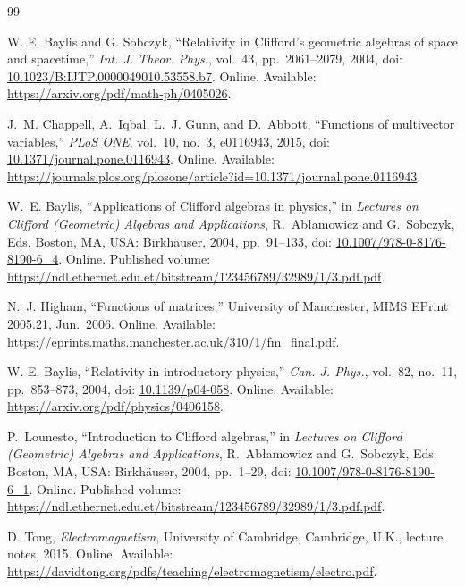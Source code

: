 \documentclass[11pt]{article}
\numberwithin{equation}{section}
\begin{document}
\clearpage
\begin{thebibliography}{99}
W. E. Baylis and G. Sobczyk,
``Relativity in Clifford's geometric algebras of space and spacetime,''
\emph{Int. J. Theor. Phys.}, vol.~43, pp.~2061--2079, 2004,
doi: \href{https://doi.org/10.1023/B:IJTP.0000049010.53558.b7}{10.1023/B:IJTP.0000049010.53558.b7}.
Online. Available: \url{https://arxiv.org/pdf/math-ph/0405026}.

J.~M. Chappell, A.~Iqbal, L.~J. Gunn, and D.~Abbott,
``Functions of multivector variables,'' \emph{PLoS ONE}, vol.~10, no.~3,
e0116943, 2015,
doi: \href{https://doi.org/10.1371/journal.pone.0116943}{10.1371/journal.pone.0116943}.
Online. Available: \url{https://journals.plos.org/plosone/article?id=10.1371/journal.pone.0116943}.

W.~E. Baylis, ``Applications of Clifford algebras in physics,''
in \emph{Lectures on Clifford (Geometric) Algebras and Applications},
R.~Ab{\l}amowicz and G.~Sobczyk, Eds. Boston, MA, USA: Birkh{\"a}user,
2004, pp.~91--133,
doi: \href{https://doi.org/10.1007/978-0-8176-8190-6_4}{10.1007/978-0-8176-8190-6\_4}.
Online. Published volume:
\url{https://ndl.ethernet.edu.et/bitstream/123456789/32989/1/3.pdf.pdf}.

N.~J. Higham, ``Functions of matrices,'' University of Manchester,
MIMS EPrint 2005.21, Jun.~2006.
Online. Available: \url{https://eprints.maths.manchester.ac.uk/310/1/fm_final.pdf}.

W. E. Baylis, ``Relativity in introductory physics,''
\emph{Can. J. Phys.}, vol.~82, no.~11, pp.~853--873, 2004,
doi: \href{https://doi.org/10.1139/p04-058}{10.1139/p04-058}.
Online. Available: \url{https://arxiv.org/pdf/physics/0406158}.

P.~Lounesto, ``Introduction to Clifford algebras,''
in \emph{Lectures on Clifford (Geometric) Algebras and Applications},
R.~Ab{\l}amowicz and G.~Sobczyk, Eds. Boston, MA, USA: Birkh{\"a}user,
2004, pp.~1--29,
doi: \href{https://doi.org/10.1007/978-0-8176-8190-6_1}{10.1007/978-0-8176-8190-6\_1}.
Online. Published volume:
\url{https://ndl.ethernet.edu.et/bitstream/123456789/32989/1/3.pdf.pdf}.

D. Tong, \emph{Electromagnetism}, University of Cambridge,
Cambridge, U.K., lecture notes, 2015.
Online. Available: \url{https://davidtong.org/pdfs/teaching/electromagnetism/electro.pdf}.


\end{thebibliography}
\end{document}
